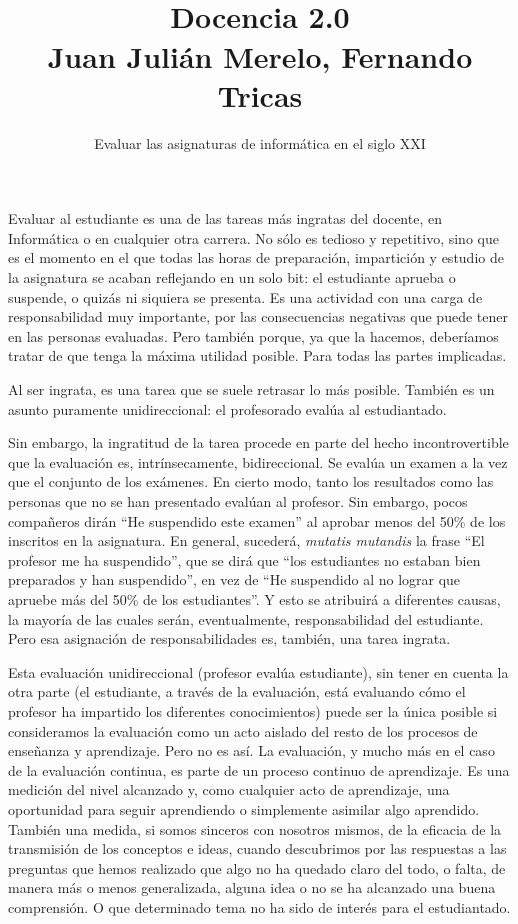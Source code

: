 \documentclass[twoside,10pt]{article}
\title{\ \\ Docencia 2.0\\ \large Juan Julián Merelo, Fernando Tricas}
\author{\LARGE Evaluar las asignaturas de informática en el siglo XXI}
\date{}
\begin{document}
\addtocounter{page}{2}

\maketitle
\vspace*{-5ex}

\begin{multicols}{2}



Evaluar al estudiante es una de las tareas más ingratas del docente,
en Informática o en cualquier otra carrera. No sólo es tedioso y
repetitivo, sino que es el momento en el que todas las horas de
preparación, impartición y estudio de la asignatura se acaban reflejando en un
solo bit: el estudiante aprueba o suspende, o quizás ni siquiera se
presenta.
Es  una actividad con una carga de responsabilidad muy importante, por las
consecuencias negativas que puede tener en las personas evaluadas. Pero
también porque, ya que la hacemos, deberíamos tratar de que tenga la máxima
utilidad posible. Para todas las partes implicadas. 

Al ser ingrata, es una tarea que se suele retrasar lo más
posible. También es un asunto puramente unidireccional: el profesorado
evalúa al estudiantado.

Sin embargo, la ingratitud de la tarea procede en parte del hecho
incontrovertible que la evaluación es, intrínsecamente,
bidireccional. Se evalúa un examen a la vez que el conjunto de los
exámenes. En cierto modo, tanto los resultados como las personas que no se
han presentado evalúan al profesor. Sin embargo, pocos compañeros dirán
``He suspendido este
examen'' al aprobar menos del 50\% de los inscritos en la
asignatura. En general, sucederá, {\em mutatis mutandis} la frase ``El
profesor me ha suspendido'', que se dirá que ``los estudiantes no
estaban bien preparados y han suspendido'', en vez de ``He suspendido
al no lograr que apruebe más del 50\% de los estudiantes''. Y esto se atribuirá a
diferentes causas, la mayoría de las cuales serán, eventualmente,
responsabilidad del estudiante. Pero esa asignación de
responsabilidades es, también, una tarea ingrata. 

Esta evaluación unidireccional (profesor evalúa estudiante), sin tener
en cuenta la otra parte (el estudiante, a través de la evaluación,
está evaluando cómo el profesor ha impartido los diferentes
conocimientos) puede ser la única posible si consideramos la
evaluación como un acto aislado del resto de los procesos de enseñanza
y aprendizaje. Pero no es así. 
La evaluación, y
mucho más en el caso de la evaluación continua, es parte de un proceso
continuo de aprendizaje.
 Es una medición del nivel alcanzado y, como
cualquier acto de aprendizaje, una oportunidad para seguir aprendiendo
o simplemente asimilar algo aprendido. 
También una medida, si somos
sinceros con nosotros mismos, de la eficacia de la transmisión de los
conceptos e ideas, cuando descubrimos por las respuestas a las 
preguntas que hemos realizado que algo no ha quedado claro del todo, o
falta, de manera más o menos generalizada, alguna idea o no se ha
alcanzado una buena comprensión. O que determinado tema no ha sido de interés
para el estudiantado. 


\end{multicols}
\end{document}

